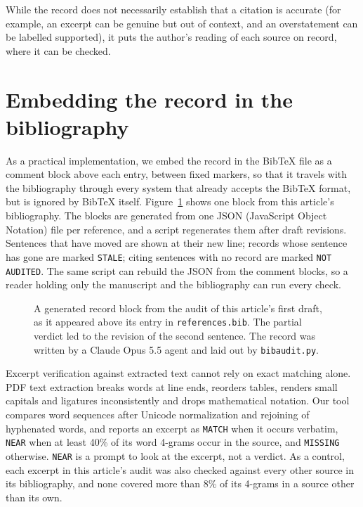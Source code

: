 \documentclass[11pt]{article}
\begin{document}
While the record does not necessarily establish that a citation is accurate (for example, an excerpt can be genuine but out of context, and an overstatement can be labelled supported), it puts the author's reading of each source on record, where it can be checked.

\section{Embedding the record in the bibliography}

As a practical implementation, we embed the record in the BibTeX file as a comment block above each entry, between fixed markers, so that it travels with the bibliography through every system that already accepts the BibTeX format, but is ignored by BibTeX itself. Figure~\ref{fig:example} shows one block from this article's bibliography. The blocks are generated from one JSON (JavaScript Object Notation) file per reference, and a script regenerates them after draft revisions. Sentences that have moved are shown at their new line; records whose sentence has gone are marked \texttt{STALE}; citing sentences with no record are marked \texttt{NOT AUDITED}. The same script can rebuild the JSON from the comment blocks, so a reader holding only the manuscript and the bibliography can run every check.

\begin{figure}[t]
\centering
{}
\caption{A generated record block from the audit of this article's first draft, as it appeared above its entry in \texttt{references.bib}. The partial verdict led to the revision of the second sentence. The record was written by a Claude Opus 5.5 agent and laid out by \texttt{bibaudit.py}.}
\label{fig:example}
\end{figure}

Excerpt verification against extracted text cannot rely on exact matching alone. PDF text extraction breaks words at line ends, reorders tables, renders small capitals and ligatures inconsistently and drops mathematical notation. Our tool compares word sequences after Unicode normalization and rejoining of hyphenated words, and reports an excerpt as \texttt{MATCH} when it occurs verbatim, \texttt{NEAR} when at least 40\% of its word 4-grams occur in the source, and \texttt{MISSING} otherwise. \texttt{NEAR} is a prompt to look at the excerpt, not a verdict. As a control, each excerpt in this article's audit was also checked against every other source in its bibliography, and none covered more than 8\% of its 4-grams in a source other than its own.
\end{document}
